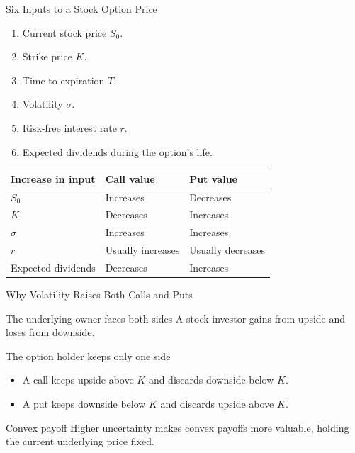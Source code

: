 \documentclass[aspectratio=169,11pt]{beamer}
\begin{document}
\begin{frame}{Six Inputs to a Stock Option Price}
    \begin{enumerate}
        \item Current stock price \(S_0\).
        \item Strike price \(K\).
        \item Time to expiration \(T\).
        \item Volatility \(\sigma\).
        \item Risk-free interest rate \(r\).
        \item Expected dividends during the option's life.
    \end{enumerate}

    \vspace{0.5em}
    \begin{center}
    \begin{tabular}{lll}
        \toprule
        Increase in input & Call value & Put value \\
        \midrule
        \(S_0\) & Increases & Decreases \\
        \(K\) & Decreases & Increases \\
        \(\sigma\) & Increases & Increases \\
        \(r\) & Usually increases & Usually decreases \\
        Expected dividends & Decreases & Increases \\
        \bottomrule
    \end{tabular}
    \end{center}
\end{frame}

\begin{frame}{Why Volatility Raises Both Calls and Puts}
    \begin{block}{The underlying owner faces both sides}
        A stock investor gains from upside and loses from downside.
    \end{block}

    \begin{block}{The option holder keeps only one side}
        \begin{itemize}
            \item A call keeps upside above \(K\) and discards downside below \(K\).
            \item A put keeps downside below \(K\) and discards upside above \(K\).
        \end{itemize}
    \end{block}

    \begin{alertblock}{Convex payoff}
        Higher uncertainty makes convex payoffs more valuable, holding the current underlying price fixed.
    \end{alertblock}
\end{frame}
\end{document}
